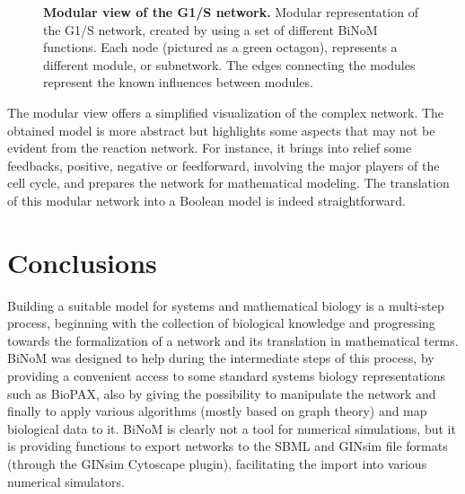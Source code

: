 \documentclass[10pt]{bmc_article}
\newenvironment{bmcformat}{\baselineskip20pt\sloppy\setboolean{publ}{false}}{\baselineskip20pt\sloppy}
\begin{document}
\begin{bmcformat}
\begin{figure}[h]
 \caption{\label{g1smodular}  \textbf{Modular view of the G1/S network.}
	Modular representation of the G1/S network, created by using a set of
different BiNoM functions. Each node (pictured as a green octagon), represents a
different module, or subnetwork. The edges connecting the modules represent the
 known influences between modules. }
\end{figure}

The modular view offers a simplified visualization of the complex network. The
obtained model is more abstract but highlights some aspects that may not be
evident from the reaction network. For instance, it brings into relief some
feedbacks, positive, negative or feedforward, involving the major players of the
cell cycle, and prepares the network for mathematical modeling. The translation
of this modular network into a Boolean model is indeed straightforward. 

\section*{Conclusions}

Building a suitable model for systems and mathematical biology is a multi-step
process, beginning with the collection of biological knowledge and progressing
towards the formalization of a network and its translation in mathematical
terms. BiNoM was designed to help during the intermediate steps of this process,
by providing a convenient access to some standard systems biology
representations such as BioPAX, also by giving the possibility to manipulate the
network and finally to apply various algorithms (mostly based on graph theory)
and map biological data to it. BiNoM is clearly not a tool for numerical
simulations, but it is providing functions to export networks to the SBML and
GINsim file formats (through the GINsim Cytoscape plugin), facilitating the
import into various numerical simulators.


\end{bmcformat}
\end{document}
